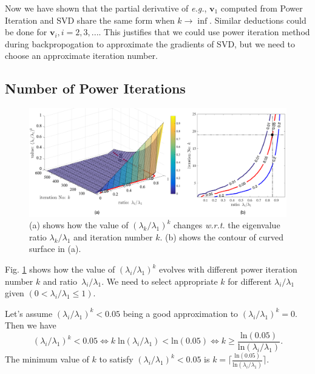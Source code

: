 \documentclass{article}
\newcommand{\bv}{\mathbf{v}}
\begin{document}
Now we have shown that the partial derivative of \emph{e.g.}, $\bv_1$ computed from Power Iteration and SVD share the same form when $k\rightarrow \inf$.
Similar deductions could be done for  $\bv_i, i=2,3,...$.
This justifies that we could use power iteration method during backpropogation to approximate the gradients of SVD, but we need to choose an approximate iteration number.

\subsection{Number of Power Iterations}

\begin{figure}[!htb]
\begin{center}
\includegraphics[width=\linewidth]{ratio-k.pdf}
\end{center}
\caption{(a) shows how the value of $(\lambda_k/\lambda_1)^k$ changes \emph{w.r.t.} the eigenvalue ratio $\lambda_k/\lambda_1$ and iteration number $k$. (b) shows the contour of curved surface in (a).}
\label{fig: curve}
\end{figure}

Fig. \ref{fig: curve} shows how the value of $(\lambda_i/\lambda_1)^k$ evolves with different power iteration number $k$ and ratio~$\lambda_i/\lambda_1$. We need to select appropriate $k$ for different $\lambda_i/\lambda_1$ given $(0 < \lambda_i/\lambda_1 \leq 1)$. 

Let's assume $(\lambda_i/\lambda_1)^k<0.05$ being a good approximation to $(\lambda_i/\lambda_1)^k=0$. Then we have
\begin{equation}
(\lambda_i/\lambda_1)^k<0.05 \Leftrightarrow k\; \text{ln}(\lambda_i/\lambda_1) < \text{ln}(0.05) \Leftrightarrow k \geq \frac{\text{ln}(0.05)}{\text{ln}(\lambda_i/\lambda_1)}.
\end{equation}
The minimum value of $k$ to satisfy $(\lambda_i/\lambda_1)^k<0.05$ is $k = \lceil \frac{\text{ln}(0.05)}{\text{ln}(\lambda_i/\lambda_1)} \rceil$.
\end{document}
